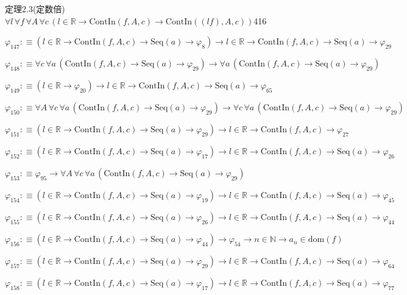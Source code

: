 \begin{fullproof}{定理2.3(定数倍)}{$\forall l\,\forall f\,\forall A\,\forall c\,(l \in \mathbb{R} \to \mathrm{ContIn}(f,A,c) \to \mathrm{ContIn}((l f),A,c))$}{416}
\begin{abbrevlist}
\item $\varphi_{147} :\equiv (l \in \mathbb{R} \to \mathrm{ContIn}(f,A,c) \to \mathrm{Seq}(a) \to \varphi_{8}) \to l \in \mathbb{R} \to \mathrm{ContIn}(f,A,c) \to \mathrm{Seq}(a) \to \varphi_{29}$
\item $\varphi_{148} :\equiv \forall c\,\forall a\,(\mathrm{ContIn}(f,A,c) \to \mathrm{Seq}(a) \to \varphi_{29}) \to \forall a\,(\mathrm{ContIn}(f,A,c) \to \mathrm{Seq}(a) \to \varphi_{29})$
\item $\varphi_{149} :\equiv (l \in \mathbb{R} \to \varphi_{20}) \to l \in \mathbb{R} \to \mathrm{ContIn}(f,A,c) \to \mathrm{Seq}(a) \to \varphi_{65}$
\item $\varphi_{150} :\equiv \forall A\,\forall c\,\forall a\,(\mathrm{ContIn}(f,A,c) \to \mathrm{Seq}(a) \to \varphi_{29}) \to \forall c\,\forall a\,(\mathrm{ContIn}(f,A,c) \to \mathrm{Seq}(a) \to \varphi_{29})$
\item $\varphi_{151} :\equiv (l \in \mathbb{R} \to \mathrm{ContIn}(f,A,c) \to \mathrm{Seq}(a) \to \varphi_{29}) \to l \in \mathbb{R} \to \mathrm{ContIn}(f,A,c) \to \varphi_{27}$
\item $\varphi_{152} :\equiv (l \in \mathbb{R} \to \mathrm{ContIn}(f,A,c) \to \mathrm{Seq}(a) \to \varphi_{17}) \to l \in \mathbb{R} \to \mathrm{ContIn}(f,A,c) \to \mathrm{Seq}(a) \to \varphi_{26}$
\item $\varphi_{153} :\equiv \varphi_{95} \to \forall A\,\forall c\,\forall a\,(\mathrm{ContIn}(f,A,c) \to \mathrm{Seq}(a) \to \varphi_{29})$
\item $\varphi_{154} :\equiv (l \in \mathbb{R} \to \mathrm{ContIn}(f,A,c) \to \mathrm{Seq}(a) \to \varphi_{19}) \to l \in \mathbb{R} \to \mathrm{ContIn}(f,A,c) \to \mathrm{Seq}(a) \to \varphi_{45}$
\item $\varphi_{155} :\equiv (l \in \mathbb{R} \to \mathrm{ContIn}(f,A,c) \to \mathrm{Seq}(a) \to \varphi_{26}) \to l \in \mathbb{R} \to \mathrm{ContIn}(f,A,c) \to \mathrm{Seq}(a) \to \varphi_{44}$
\item $\varphi_{156} :\equiv (l \in \mathbb{R} \to \mathrm{ContIn}(f,A,c) \to \mathrm{Seq}(a) \to \varphi_{44}) \to \varphi_{54} \to n \in \mathbb{N} \to a_{n} \in \mathrm{dom}(f)$
\item $\varphi_{157} :\equiv (l \in \mathbb{R} \to \mathrm{ContIn}(f,A,c) \to \mathrm{Seq}(a) \to \varphi_{29}) \to l \in \mathbb{R} \to \mathrm{ContIn}(f,A,c) \to \mathrm{Seq}(a) \to \varphi_{64}$
\item $\varphi_{158} :\equiv (l \in \mathbb{R} \to \mathrm{ContIn}(f,A,c) \to \mathrm{Seq}(a) \to \varphi_{17}) \to l \in \mathbb{R} \to \mathrm{ContIn}(f,A,c) \to \mathrm{Seq}(a) \to \varphi_{77}$

\end{abbrevlist}
\end{fullproof}
